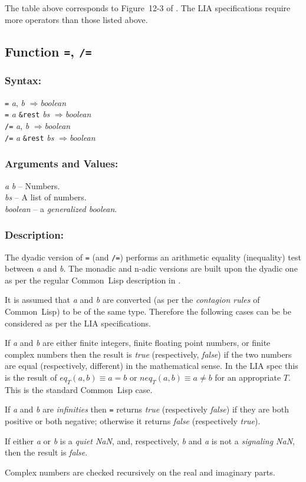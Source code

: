 \documentclass[10pt,fleqn]{article}
\newcommand{\CL}{\textsf{Common~Lisp}}
\newcommand{\code}[1]{\texttt{#1}}
\newcommand{\clieeeterm}[1]{\textit{#1}}
\newcommand{\varname}[1]{\textit{#1}}
\newcommand{\clterm}[1]{\textit{#1}}
\newcommand{\RArrow}{$\Rightarrow$}
\newcommand{\DDictionaryItem}[1]{\vspace*{6pt}\noindent\hrulefill\vspace*{-9pt}\subsection*{#1}}
\newcommand{\DSyntax}{\subsubsection*{Syntax:}}
\newcommand{\DArgsNValues}{\subsubsection*{Arguments and Values:}}
\newcommand{\DDescription}{\subsubsection*{Description:}}
\begin{document}
\noindent
The table above corresponds to Figure~12-3 of
\cite{1996:ANSIHyperSpec}.  The LIA specifications require more
operators than those listed above.


\DDictionaryItem{Function \code{=}, \code{/=}}
\index{*!\code{=}}
\index{*!\code{/=}}

\DSyntax{}

\code{=} \varname{a}, \varname{b} \RArrow \varname{boolean}\\
\code{=} \varname{a} \code{\&rest} \varname{bs} \RArrow \varname{boolean}\\
\code{/=} \varname{a}, \varname{b} \RArrow \varname{boolean}\\
\code{/=} \varname{a} \code{\&rest} \varname{bs} \RArrow \varname{boolean}

\DArgsNValues{}

\varname{a} \varname{b} -- Numbers.\\
\varname{bs} -- A list of numbers.\\
\varname{boolean} -- a \clterm{generalized boolean}.

\DDescription{}

The dyadic version of \code{=} (and \code{/=}) performs an arithmetic
equality (inequality) test between \varname{a} and \varname{b}.  The
monadic and n-adic versions are built upon the dyadic one as per the
regular \CL{} description in \cite{1996:ANSIHyperSpec}.

It is assumed that \varname{a} and \varname{b} are converted (as per
the \emph{contagion rules} of \CL{}) to be of the same type.
Therefore the following cases can be be considered as per the LIA
specifications.

\begin{description}
\item If \varname{a} and \varname{b} are either finite integers, finite
floating point numbers, or finite complex numbers then the result is
\varname{true} (respectively, \varname{false}) if the two numbers are
equal (respectively, different) in the mathematical sense.  In the
LIA spec this is the result of $\mathit{eq}_T(a, b) \equiv a = b$ or
$\mathit{neq}_T(a, b) \equiv a \neq b$ for an
appropriate $T$.  This is the standard \CL{} case.

\item If \varname {a} and \varname {b} are \clieeeterm{infinities} then
\code{=} returns \varname{true} (respectively \varname{false}) if they
are both positive or both negative; otherwise it returns
\varname{false} (respectively \varname{true}).

\item If either \varname {a} or \varname {b} is a \clieeeterm{quiet NaN},
and, respectively, \varname {b} and \varname {a} is not a
\clieeeterm{signaling NaN}, then the result is \varname{false}.

\item Complex numbers are checked recursively on the real and imaginary
parts.
\end{description}
\end{document}

